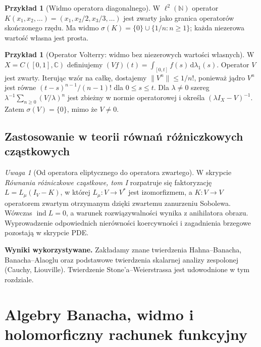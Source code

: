 \documentclass[11pt,a4paper]{article}
\numberwithin{equation}{section}
\theoremstyle{plain}
\theoremstyle{definition}
\newtheorem{przyklad}[twierdzenie]{Przykład}
\theoremstyle{remark}
\newtheorem{uwaga}[twierdzenie]{Uwaga}
\newcommand{\C}{\mathbb C}
\newcommand{\N}{\mathbb N}
\begin{document}
\begin{przyklad}[Widmo operatora diagonalnego]
\label{ex:diagonal-spectrum30}
W $\ell^2(\N)$ operator
$K(x_1,x_2,\ldots)=(x_1,x_2/2,x_3/3,\ldots)$
jest zwarty jako granica operatorów skończonego rzędu.
Ma widmo $\sigma(K)=\{0\}\cup\{1/n:n\ge1\}$;
każda niezerowa wartość własna jest prosta.
\end{przyklad}

\begin{przyklad}[Operator Volterry: widmo bez niezerowych wartości własnych]
\label{ex:volterra-spectrum30}
W $X=C([0,1],\C)$ definiujemy
$(Vf)(t)=\int_{[0,t]}f(s)\,\mathrm d\lambda_1(s)$.
Operator $V$ jest zwarty. Iterując wzór na całkę,
dostajemy $\|V^n\|\le 1/n!$, ponieważ jądro $V^n$
jest równe $(t-s)^{n-1}/(n-1)!$ dla $0\le s\le t$.
Dla $\lambda\ne0$ szereg
$\lambda^{-1}\sum_{n\ge0}(V/\lambda)^n$
jest zbieżny w normie operatorowej i określa
$(\lambda I_X-V)^{-1}$. Zatem $\sigma(V)=\{0\}$,
mimo że $V\ne0$.
\end{przyklad}

\subsection{Zastosowanie w teorii równań różniczkowych cząstkowych}

\begin{uwaga}[Od operatora eliptycznego do operatora zwartego]
\label{rem:elliptic-fredholm30}
W skrypcie \emph{Równania różniczkowe cząstkowe, tom I}
rozpatruje się faktoryzację $L=L_\mu(I_V-K)$,
w której $L_\mu:V\to V^*$ jest izomorfizmem,
a $K:V\to V$ operatorem zwartym otrzymanym dzięki
zwartemu zanurzeniu Sobolewa. Wówczas $\operatorname{ind}L=0$,
a warunek rozwiązywalności wynika z anihilatora obrazu.
Wyprowadzenie odpowiednich nierówności koercywności
i zagadnienia brzegowe pozostają w skrypcie PDE.
\end{uwaga}


\setcounter{section}{30}
\noindent\textbf{Wyniki wykorzystywane.} Zakładamy znane twierdzenia Hahna--Banacha, Banacha--Alaoglu oraz podstawowe twierdzenia skalarnej analizy zespolonej (Cauchy, Liouville). Twierdzenie Stone'a--Weierstrassa jest udowodnione w tym rozdziale.\par\medskip
\section{Algebry Banacha, widmo i holomorficzny rachunek funkcyjny}
\label{sec:banach-algebras31}
\end{document}
